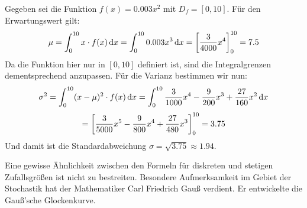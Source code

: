 \documentclass[ngerman, 12pt]{nssheetxea}
\begin{document}
\begin{example}
Gegeben sei die Funktion $f(x)=\num{0,003}x^2$ mit $D_f=[0,10]$. Für den Erwartungswert gilt:
\[ \mu = \int_0^{10} x\cdot f(x) \diff x = \int_0^{10} \num{0,003}x^3 \diff x = \mleft[ 
\frac{3}{4000}x^4  \mright]_0^{10} = \num{7,5} \]
Da die Funktion hier nur in $[0,10]$ definiert ist, sind die Integralgrenzen dementsprechend anzupassen. Für die Varianz bestimmen wir nun:
\[ \sigma^2 = \int_0^{10} (x-\mu)^2 \cdot f(x) \mathop{}\!\mathrm{d} x =  \int_0^{10} \dfrac{3}{1000}x^4 - \dfrac{9}{200} x^3 + \dfrac{27}{160} x^2 \mathop{}\!\mathrm{d} x \] \[ = \mleft[ \dfrac{3}{5000}x^5 - \dfrac{9}{800} x^4 + \dfrac{27}{480} x^3  \mright]_0^{10} = \num{3,75}  \]
Und damit ist die Standardabweichung $\sigma = \sqrt{\num{3,75}}\approx \num{1,94}$.
\end{example}

Eine gewisse Ähnlichkeit zwischen den Formeln für diskreten und stetigen Zufallsgrößen ist nicht zu bestreiten. Besondere Aufmerksamkeit im Gebiet der Stochastik hat der Mathematiker Carl Friedrich Gauß verdient. Er entwickelte die Gauß'sche Glockenkurve.
\end{document}
